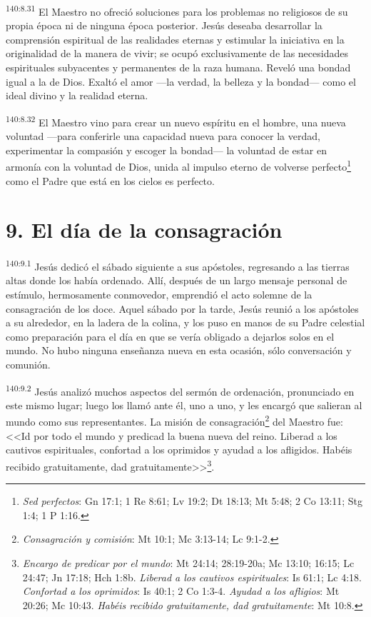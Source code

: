 \par 
\textsuperscript{140:8.31} El Maestro no ofreció soluciones para los problemas no religiosos de su propia época ni de ninguna época posterior. Jesús deseaba desarrollar la comprensión espiritual de las realidades eternas y estimular la iniciativa en la originalidad de la manera de vivir; se ocupó exclusivamente de las necesidades espirituales subyacentes y permanentes de la raza humana. Reveló una bondad igual a la de Dios. Exaltó el amor ---la verdad, la belleza y la bondad--- como el ideal divino y la realidad eterna.

\par 
\textsuperscript{140:8.32} El Maestro vino para crear un nuevo espíritu en el hombre, una nueva voluntad ---para conferirle una capacidad nueva para conocer la verdad, experimentar la compasión y escoger la bondad--- la voluntad de estar en armonía con la voluntad de Dios, unida al impulso eterno de volverse perfecto\footnote{\textit{Sed perfectos}: Gn 17:1; 1 Re 8:61; Lv 19:2; Dt 18:13; Mt 5:48; 2 Co 13:11; Stg 1:4; 1 P 1:16.} como el Padre que está en los cielos es perfecto.

\section*{9. El día de la consagración}
\par 
\textsuperscript{140:9.1} Jesús dedicó el sábado siguiente a sus apóstoles, regresando a las tierras altas donde los había ordenado. Allí, después de un largo mensaje personal de estímulo, hermosamente conmovedor, emprendió el acto solemne de la consagración de los doce. Aquel sábado por la tarde, Jesús reunió a los apóstoles a su alrededor, en la ladera de la colina, y los puso en manos de su Padre celestial como preparación para el día en que se vería obligado a dejarlos solos en el mundo. No hubo ninguna enseñanza nueva en esta ocasión, sólo conversación y comunión.

\par 
\textsuperscript{140:9.2} Jesús analizó muchos aspectos del sermón de ordenación, pronunciado en este mismo lugar; luego los llamó ante él, uno a uno, y les encargó que salieran al mundo como sus representantes. La misión de consagración\footnote{\textit{Consagración y comisión}: Mt 10:1; Mc 3:13-14; Lc 9:1-2.} del Maestro fue: <<Id por todo el mundo y predicad la buena nueva del reino. Liberad a los cautivos espirituales, confortad a los oprimidos y ayudad a los afligidos. Habéis recibido gratuitamente, dad gratuitamente>>\footnote{\textit{Encargo de predicar por el mundo}: Mt 24:14; 28:19-20a; Mc 13:10; 16:15; Lc 24:47; Jn 17:18; Hch 1:8b. \textit{Liberad a los cautivos espirituales}: Is 61:1; Lc 4:18. \textit{Confortad a los oprimidos}: Is 40:1; 2 Co 1:3-4. \textit{Ayudad a los afligios}: Mt 20:26; Mc 10:43. \textit{Habéis recibido gratuitamente, dad gratuitamente}: Mt 10:8.}.

